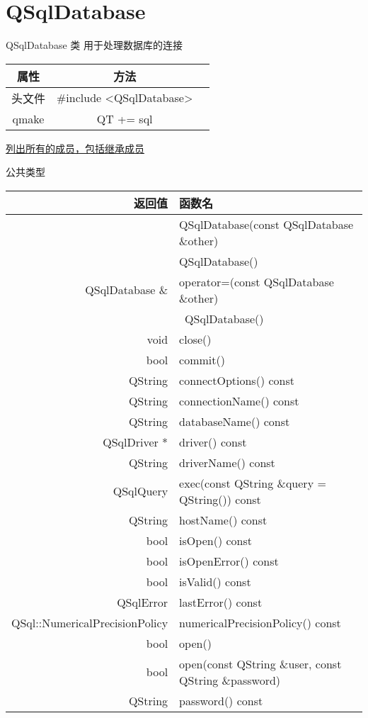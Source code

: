 \chapter{QSqlDatabase}
QSqlDatabase 类 用于处理数据库的连接

\begin{tabular}{|c|c|p{1.5cm}|}
	\hline
	属性 & 方法 \\
	\hline
	头文件 & \#include <QSqlDatabase>\\      
	\hline
	qmake & QT += sql\\      
	\hline
\end{tabular}

\href{https://doc.qt.io/qt-5/qsqldatabase-members.html}{列出所有的成员，包括继承成员}


公共类型

\begin{tabular}{|r|l|}
\hline
返回值 & 函数名 \\
\hline
 & QSqlDatabase(const QSqlDatabase \&other) \\ 
\hline
 & QSqlDatabase()\\
\hline
QSqlDatabase \&	&operator=(const QSqlDatabase \&other)\\
\hline
 & ~QSqlDatabase()\\
\hline
void& close()\\
\hline
bool&commit()\\
\hline
QString	&connectOptions() const\\
\hline
QString	&connectionName() const\\
\hline
QString	&databaseName() const\\
\hline
QSqlDriver *&	driver() const\\
\hline
QString	&driverName() const\\
\hline
QSqlQuery&	exec(const QString \&query = QString()) const\\
\hline
QString	&hostName() const\\
\hline
bool	&isOpen() const\\
\hline
bool	&isOpenError() const\\
\hline
bool	&isValid() const\\
\hline
QSqlError&	lastError() const\\
\hline
QSql::NumericalPrecisionPolicy & numericalPrecisionPolicy() const\\
\hline
bool	&open()\\
\hline
bool&	open(const QString \&user, const QString \&password)\\
\hline
QString&	password() const\\

\end{tabular}
